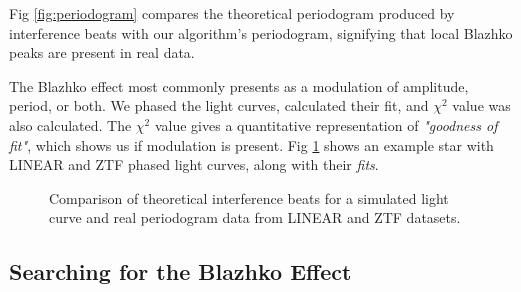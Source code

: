 \documentclass{aa}
\begin{document}
  Fig \ref{fig:periodogram} compares the theoretical periodogram produced by interference beats with our algorithm's periodogram, signifying that local Blazhko peaks are present in real data.

The Blazhko effect most commonly presents as a modulation of amplitude, period, or both. 
We phased the light curves, calculated their fit, and $\chi^2$ value was also calculated. The $\chi^2$ value gives a quantitative representation of \textit{"goodness of fit"}, which shows us if modulation is present. Fig \ref{fig:lc_pair} shows an example star with LINEAR and ZTF phased light curves, along with their {\it fits}. 

\begin{figure}[ht]
  \centering
       \caption{Comparison of theoretical interference beats for a simulated light curve and real periodogram data from LINEAR and ZTF datasets.}
       \label{fig:lc_pair}
  \end{figure}

  \subsection{Searching for the Blazhko Effect}
\end{document}
